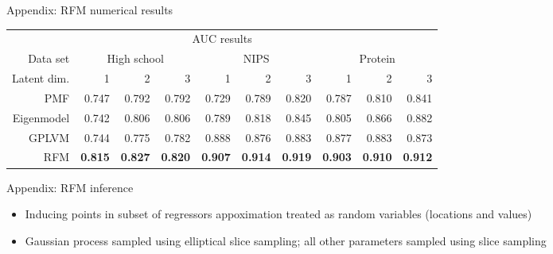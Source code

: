 \begin{frame}{Appendix: RFM numerical results}
  \begin{block}{}
    \begin{center}
    \tiny
  \begin{tabular}{r | r r r | r r r | r r r}
    \multicolumn{10}{c}{AUC results} \\
    \addlinespace[2pt]
    Data set & \multicolumn{3}{c|}{High school} & \multicolumn{3}{c|}{NIPS} & \multicolumn{3}{c}{Protein} \\
    Latent dim. & 1 & 2 & 3 & 1 & 2 & 3 & 1 & 2 & 3 \\
    \midrule
    PMF                   & 0.747 & 0.792 & 0.792 & 0.729 & 0.789 & 0.820 & 0.787 & 0.810 & 0.841 \\
    Eigenmodel            & 0.742 & 0.806 & 0.806 & 0.789 & 0.818 & 0.845 & 0.805 & 0.866 & 0.882 \\
    GPLVM                 & 0.744 & 0.775 & 0.782 & 0.888 & 0.876 & 0.883 & 0.877 & 0.883 & 0.873 \\
    RFM & \textbf{0.815} & \textbf{0.827} & \textbf{0.820} & \textbf{0.907} & \textbf{0.914} & \textbf{0.919} & \textbf{0.903} & \textbf{0.910} & \textbf{0.912}
  \end{tabular}
\end{center}
  \end{block}
\end{frame}

\begin{frame}{Appendix: RFM inference}
  \begin{block}{}
\begin{itemize}
\item Inducing points in subset of regressors appoximation treated as random variables (locations and values)
\vspace{2\baselineskip}
\item Gaussian process sampled using elliptical slice sampling; all other parameters sampled using slice sampling
\end{itemize}
  \end{block}
\end{frame}

